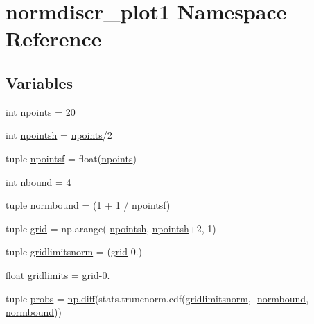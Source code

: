 \hypertarget{namespacenormdiscr__plot1}{}\section{normdiscr\+\_\+plot1 Namespace Reference}
\label{namespacenormdiscr__plot1}
\subsection*{Variables}
\begin{DoxyCompactItemize}
\item 
int \hyperlink{namespacenormdiscr__plot1_a485936f90b1ce55005303b1b7a1087da}{npoints} = 20
\item 
int \hyperlink{namespacenormdiscr__plot1_ad5aacb86498a3f1b06f4b093db60c159}{npointsh} = \hyperlink{namespacenormdiscr__plot1_a485936f90b1ce55005303b1b7a1087da}{npoints}/2
\item 
tuple \hyperlink{namespacenormdiscr__plot1_a5b663a435991ce67832c93f23719c25b}{npointsf} = float(\hyperlink{namespacenormdiscr__plot1_a485936f90b1ce55005303b1b7a1087da}{npoints})
\item 
int \hyperlink{namespacenormdiscr__plot1_a45ad13d7c59285146303f9301fad25dc}{nbound} = 4
\item 
tuple \hyperlink{namespacenormdiscr__plot1_abc9ece7a52dab740df885505bfde3cce}{normbound} = (1 + 1 / \hyperlink{namespacenormdiscr__plot1_a5b663a435991ce67832c93f23719c25b}{npointsf})
\item 
tuple \hyperlink{namespacenormdiscr__plot1_af8eb490ddab12afc11e8a4e7144d7843}{grid} = np.\+arange(-\/\hyperlink{namespacenormdiscr__plot1_ad5aacb86498a3f1b06f4b093db60c159}{npointsh}, \hyperlink{namespacenormdiscr__plot1_ad5aacb86498a3f1b06f4b093db60c159}{npointsh}+2, 1)
\item 
tuple \hyperlink{namespacenormdiscr__plot1_aaef582d3badbbdc1a1f9801e2996f078}{gridlimitsnorm} = (\hyperlink{namespacenormdiscr__plot1_af8eb490ddab12afc11e8a4e7144d7843}{grid}-\/0.)
\item 
float \hyperlink{namespacenormdiscr__plot1_ae07f5378813512b75aee0b24aa421620}{gridlimits} = \hyperlink{namespacenormdiscr__plot1_af8eb490ddab12afc11e8a4e7144d7843}{grid}-\/0.
\item 
tuple \hyperlink{namespacenormdiscr__plot1_a2ba9cf9aea62e481cf4d32d07cddbd39}{probs} = \hyperlink{nnls_8f_a09a61e17e6534125097a72c24ec1380b}{np.\+diff}(stats.\+truncnorm.\+cdf(\hyperlink{namespacenormdiscr__plot1_aaef582d3badbbdc1a1f9801e2996f078}{gridlimitsnorm}, -\/\hyperlink{namespacenormdiscr__plot1_abc9ece7a52dab740df885505bfde3cce}{normbound}, \hyperlink{namespacenormdiscr__plot1_abc9ece7a52dab740df885505bfde3cce}{normbound}))

\end{DoxyCompactItemize}
